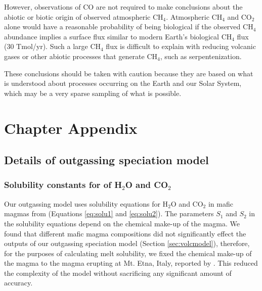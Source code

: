 However, observations of CO are not required to make conclusions about the abiotic or biotic origin of observed atmospheric CH$_4$. Atmospheric CH$_4$ and CO$_2$ alone would have a reasonable probability of being biological if the observed CH$_4$ abundance implies a surface flux similar to modern Earth’s biological CH$_4$ flux (30 Tmol/yr). Such a large CH$_4$ flux is difficult to explain with reducing volcanic gases or other abiotic processes that generate CH$_4$, such as serpentenization.

These conclusions should be taken with caution because they are based on what is understood about processes occurring on the Earth and our Solar System, which may be a very sparse sampling of what is possible.

\section{Chapter Appendix}

\subsection{Details of outgassing speciation model}

\subsubsection{Solubility constants for of H$_2$O and CO$_2$} \label{sec:solu_constants}
Our outgassing model uses solubility equations for H$_2$O and CO$_2$ in mafic magmas from \citet{Iacono-Marziano_2012} (Equations \eqref{eq:solu1} and \eqref{eq:solu2}). The parameters $S_1$ and $S_2$ in the solubility equations depend on the chemical make-up of the magma. We found that different mafic magma compositions did not significantly effect the outputs of our outgassing speciation model (Section \ref{sec:volcmodel}), therefore, for the purposes of calculating melt solubility, we fixed the chemical make-up of the magma to the magma erupting at Mt. Etna, Italy, reported by \citet{Iacono-Marziano_2012}. This reduced the complexity of the model without sacrificing any significant amount of accuracy.

